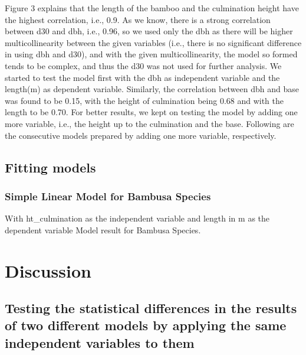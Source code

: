 \documentclass[preprint, 3p,
authoryear]{elsarticle} %
\begin{document}
Figure 3 explains that the length of the bamboo and the culmination
height have the highest correlation, i.e., 0.9. As we know, there is a
strong correlation between d30 and dbh, i.e., 0.96, so we used only the
dbh as there will be higher multicollinearity between the given
variables (i.e., there is no significant difference in using dbh and
d30), and with the given multicollinearity, the model so formed tends to
be complex, and thus the d30 was not used for further analysis. We
started to test the model first with the dbh as independent variable and
the length(m) as dependent variable. Similarly, the correlation between
dbh and base was found to be 0.15, with the height of culmination being
0.68 and with the length to be 0.70. For better results, we kept on
testing the model by adding one more variable, i.e., the height up to
the culmination and the base. Following are the consecutive models
prepared by adding one more variable, respectively.

\hypertarget{fitting-models}{%
\subsection{Fitting models}\label{fitting-models}}

\hypertarget{simple-linear-model-for-bambusa-species}{%
\subsubsection{Simple Linear Model for Bambusa
Species}\label{simple-linear-model-for-bambusa-species}}

With ht\_culmination as the independent variable and length in m as the
dependent variable Model result for Bambusa Species.

\hypertarget{discussion}{%
\section{Discussion}\label{discussion}}

\hypertarget{testing-the-statistical-differences-in-the-results-of-two-different-models-by-applying-the-same-independent-variables-to-them}{%
\subsection{Testing the statistical differences in the results of two
different models by applying the same independent variables to
them}\label{testing-the-statistical-differences-in-the-results-of-two-different-models-by-applying-the-same-independent-variables-to-them}}
\end{document}
